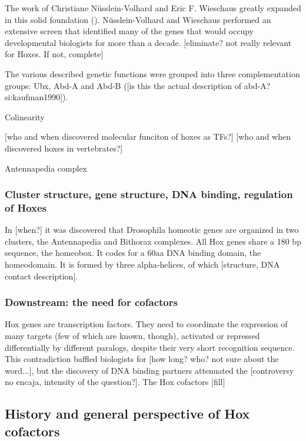 The work of Christiane Nüsslein-Volhard and Eric F. Wieschaus greatly expanded in this solid foundation (\cite{Nuesslein-Volhard1980}). Nüsslein-Volhard and Wieschaus performed an extensive screen that identified many of the genes that would occupy developmental biologists for more than a decade. [eliminate? not really relevant for Hoxes. If not, complete]

The various described genetic functions were grouped into three complementation groups: Ubx, Abd-A and Abd-B (\cite{Sanchez-Herrero1985}[is this the actual description of abd-A?si:kaufman1990]).

Colinearity \cite{Lewis1985}

[who and when discovered molecular funciton of hoxes as TFs?]
[who and when discovered hoxes in vertebrates?]

Antennapedia complex \cite{Kaufman1990}




\subsubsection{Cluster structure, gene structure, DNA binding, regulation of Hoxes}


In [when?] it was discovered that Drosophila homeotic genes are organized in two clusters, the Antennapedia \cite{Kaufman1990} and Bithorax \cite{Lewis1978}complexes.
All Hox genes share a 180 bp sequence, the homeobox. It codes for a 60aa DNA binding domain, the homeodomain. It is formed by three alpha-helices, of which [structure, DNA contact description].

\subsubsection{Downstream: the need for cofactors}
Hox genes are transcription factors. They need to coordinate the expression of many targets (few of which are known, though), activated or repressed differentially by different paralogs, despite their very short recognition sequence. This contradiction baffled biologists for [how long? who? not sure about the word...], but the discovery of DNA binding partners attenuated the [controversy no encaja, intensity of the question?]. The Hox cofactors [fill]

\subsection{History and general perspective of Hox cofactors}

